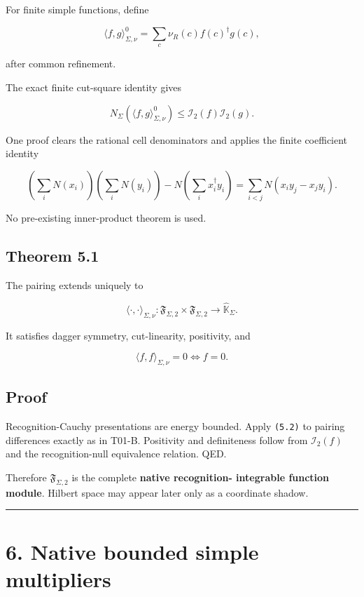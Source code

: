For finite simple functions, define

\[
\boxed{
\langle f,g\rangle_{\Sigma,\nu}^0
=
\sum_c\nu_R(c)f(c)^\dagger g(c),
}
\tag{5.1}
\]

after common refinement.

The exact finite cut-square identity gives

\[
\boxed{
N_\Sigma\left(
\langle f,g\rangle_{\Sigma,\nu}^0
\right)
\le
\mathcal I_2(f)\mathcal I_2(g).
}
\tag{5.2}
\]

One proof clears the rational cell denominators and applies the finite
coefficient identity

\[
\left(\sum_iN(x_i)\right)
\left(\sum_iN(y_i)\right)
-
N\left(\sum_i x_i^\dagger y_i\right)
=
\sum_{i<j}N(x_iy_j-x_jy_i).
\tag{5.3}
\]

No pre-existing inner-product theorem is used.

\hypertarget{theorem-5.1}{%
\subsection{Theorem 5.1}\label{theorem-5.1}}

The pairing extends uniquely to

\[
\langle\cdot,\cdot\rangle_{\Sigma,\nu}:
\mathfrak F_{\Sigma,2}\times
\mathfrak F_{\Sigma,2}
\to
\widehat{\mathbb K}_\Sigma.
\tag{5.4}
\]

It satisfies dagger symmetry, cut-linearity, positivity, and

\[
\langle f,f\rangle_{\Sigma,\nu}=0
\Longleftrightarrow f=0.
\tag{5.5}
\]

\hypertarget{proof-1}{%
\subsection{Proof}\label{proof-1}}

Recognition-Cauchy presentations are energy bounded. Apply \texttt{(5.2)} to pairing
differences exactly as in T01-B. Positivity and definiteness follow from
\(\mathcal I_2(f)\) and the recognition-null equivalence relation. QED.

Therefore \(\mathfrak F_{\Sigma,2}\) is the complete \textbf{native recognition-
integrable function module}. Hilbert space may appear later only as a coordinate
shadow.

\begin{center}\rule{0.5\linewidth}{0.5pt}\end{center}

\hypertarget{native-bounded-simple-multipliers}{%
\section{6. Native bounded simple multipliers}\label{native-bounded-simple-multipliers}}

